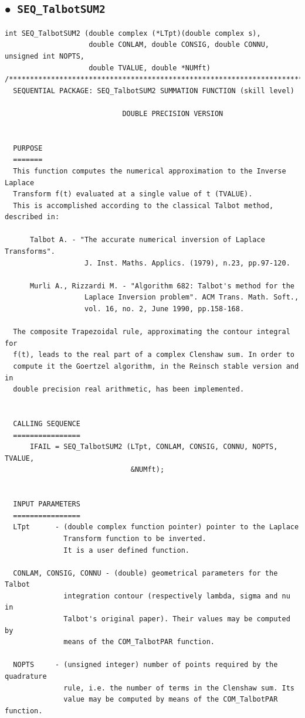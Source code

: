 \documentclass[a4paper,10pt]{report}%
\begin{document}
\subsection{\texorpdfstring{$\boldsymbol{\bullet}$}{ - }{\tt\ SEQ\_TalbotSUM2}}
\begin{lstlisting}
int SEQ_TalbotSUM2 (double complex (*LTpt)(double complex s),
                    double CONLAM, double CONSIG, double CONNU, unsigned int NOPTS,
                    double TVALUE, double *NUMft)
/*****************************************************************************
  SEQUENTIAL PACKAGE: SEQ_TalbotSUM2 SUMMATION FUNCTION (skill level)

                            DOUBLE PRECISION VERSION


  PURPOSE
  =======
  This function computes the numerical approximation to the Inverse Laplace
  Transform f(t) evaluated at a single value of t (TVALUE).
  This is accomplished according to the classical Talbot method, described in:

      Talbot A. - "The accurate numerical inversion of Laplace Transforms".
                   J. Inst. Maths. Applics. (1979), n.23, pp.97-120.

      Murli A., Rizzardi M. - "Algorithm 682: Talbot's method for the
                   Laplace Inversion problem". ACM Trans. Math. Soft.,
                   vol. 16, no. 2, June 1990, pp.158-168.

  The composite Trapezoidal rule, approximating the contour integral for
  f(t), leads to the real part of a complex Clenshaw sum. In order to
  compute it the Goertzel algorithm, in the Reinsch stable version and in
  double precision real arithmetic, has been implemented.


  CALLING SEQUENCE
  ================
      IFAIL = SEQ_TalbotSUM2 (LTpt, CONLAM, CONSIG, CONNU, NOPTS, TVALUE,
                              &NUMft);


  INPUT PARAMETERS
  ================
  LTpt      - (double complex function pointer) pointer to the Laplace
              Transform function to be inverted.
              It is a user defined function.

  CONLAM, CONSIG, CONNU - (double) geometrical parameters for the Talbot
              integration contour (respectively lambda, sigma and nu in
              Talbot's original paper). Their values may be computed by
              means of the COM_TalbotPAR function.

  NOPTS     - (unsigned integer) number of points required by the quadrature
              rule, i.e. the number of terms in the Clenshaw sum. Its
              value may be computed by means of the COM_TalbotPAR function.


\end{lstlisting}
\end{document}
